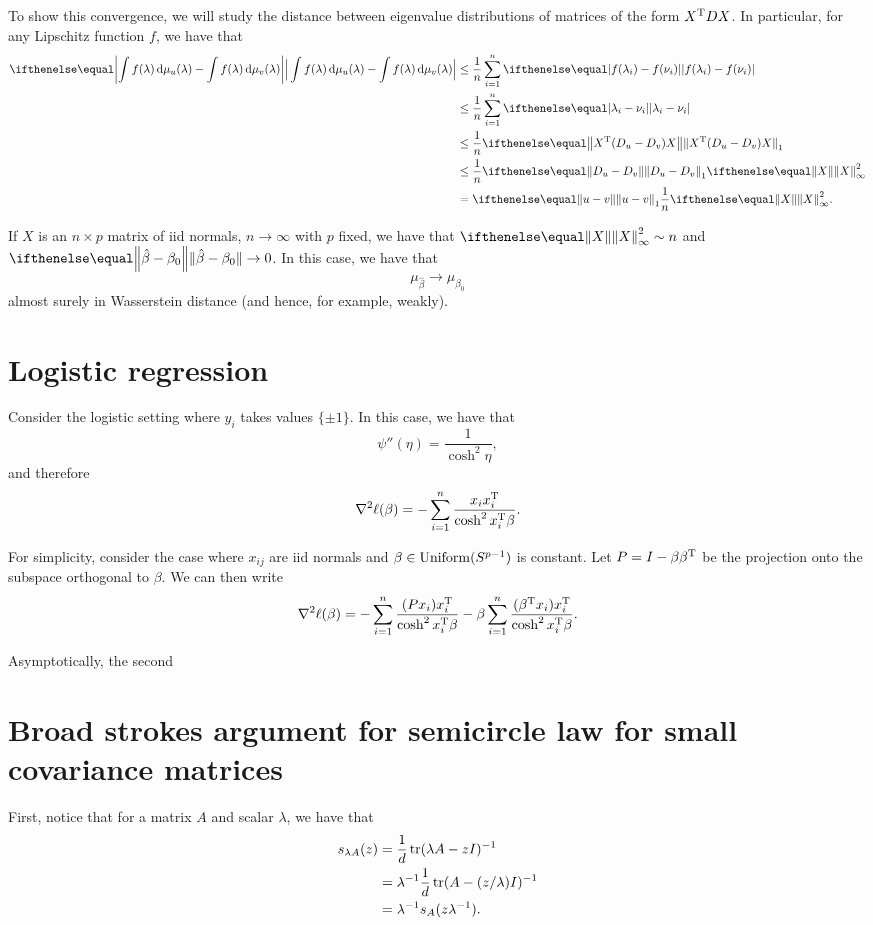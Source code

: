 \documentclass{hw-scrartcl}
\begin{document}
To show this convergence, we will study the distance between eigenvalue distributions of matrices of the form \(X^{\mathrm{T}} D X\). In particular, for any Lipschitz function \(f\), we have that
\begin{align*}
  \abs[\Big]{\int f(\lambda) \diff \mu_u(\lambda) - \int f(\lambda) \diff \mu_v(\lambda)}
  &\leq \frac{1}{n} \sum_{i=1}^n \abs{f(\lambda_i) - f(\nu_i)} \\
  &\leq \frac{1}{n} \sum_{i=1}^n \abs{\lambda_i - \nu_i} \\
  &\leq \frac{1}{n} \norm{X\transp (D_u - D_v) X}_1 \\
  &\leq \frac{1}{n} \norm{D_u - D_v}_1 \norm{X}_\infty^2 \\
  &= \norm{u - v}_1 \frac{1}{n} \norm{X}_\infty^2.
\end{align*}

If \(X\) is an \(n \times p\) matrix of iid normals, \(n\rightarrow \infty\) with \(p\) fixed, we have that \(\norm{X}_\infty^2 \sim n\) and \(\norm{\hat{\beta} - \beta_0} \rightarrow 0\). In this case, we have that
\[
  \mu_{\hat{\beta}} \rightarrow \mu_{\beta_0}
\]
almost surely in Wasserstein distance (and hence, for example, weakly).

\section{Logistic regression}
Consider the logistic setting where \(y_i\) takes values \(\{\pm 1\}\). In this case, we have that
\[
  \psi''(\eta)
  = \frac{1}{\cosh^2 \eta},
\]
and therefore
\[
  \nabla^2 \ell(\beta)
  = -\sum_{i=1}^n \frac{x_i x_i^{\mathrm{T}}}{\cosh^2 x_i^{\mathrm{T}} \beta}.
\]

For simplicity, consider the case where \(x_{ij}\) are iid normals and \(\beta \in \operatorname{Uniform}(S^{p-1})\) is constant. Let \(P = I - \beta\beta^{\mathrm{T}}\) be the projection onto the subspace orthogonal to \(\beta\). We can then write
\[
  \nabla^2 \ell(\beta)
  = -\sum_{i=1}^n \frac{(P x_i) x_i^{\mathrm{T}}}{\cosh^2 x_i^{\mathrm{T}} \beta} - \beta \sum_{i=1}^n \frac{(\beta^{\mathrm{T}} x_i) x_i^{\mathrm{T}}}{\cosh^2 x_i^{\mathrm{T}} \beta}.
\]

Asymptotically, the second

\section{Broad strokes argument for semicircle law for small covariance matrices}
First, notice that for a matrix \(A\) and scalar \(\lambda\), we have that
\begin{align*}
  s_{\lambda A}(z)
  &= \frac{1}{d} \operatorname{tr}(\lambda A - zI)^{-1} \\
  &= \lambda^{-1}\frac{1}{d} \operatorname{tr}(A - (z/\lambda) I)^{-1}\\
  &= \lambda^{-1} s_A(z \lambda^{-1}).
\end{align*}
\end{document}
